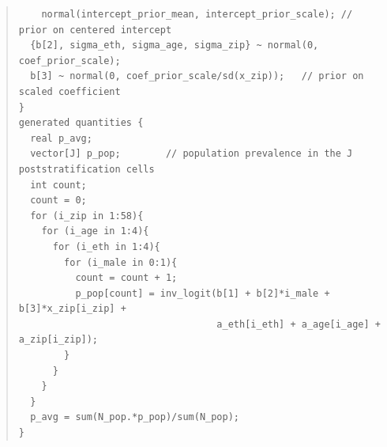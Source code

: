 \documentclass[11pt]{article}
\begin{document}
\begin{small}
\begin{quotation}
\begin{verbatim}
    normal(intercept_prior_mean, intercept_prior_scale); // prior on centered intercept
  {b[2], sigma_eth, sigma_age, sigma_zip} ~ normal(0, coef_prior_scale);
  b[3] ~ normal(0, coef_prior_scale/sd(x_zip));   // prior on scaled coefficient
}
generated quantities {
  real p_avg;
  vector[J] p_pop;        // population prevalence in the J poststratification cells
  int count;
  count = 0;
  for (i_zip in 1:58){
    for (i_age in 1:4){
      for (i_eth in 1:4){
        for (i_male in 0:1){
          count = count + 1;
          p_pop[count] = inv_logit(b[1] + b[2]*i_male + b[3]*x_zip[i_zip] +
                                   a_eth[i_eth] + a_age[i_age] + a_zip[i_zip]);
        }
      }
    }
  }
  p_avg = sum(N_pop.*p_pop)/sum(N_pop);
}
\end{verbatim}
\end{quotation}
\end{small}
\end{document}
